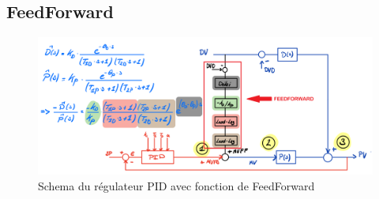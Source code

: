 \subsection{FeedForward}

\begin{figure}[h]
    \centering
    \includegraphics[width=\textwidth]{figures/schemaFF.png}
    \caption{Schema du régulateur PID avec fonction de FeedForward}
	\label{fig:schemaFF}
\end{figure}

